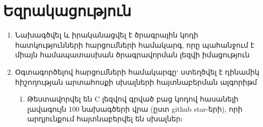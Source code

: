 {
	\section*{Եզրակացություն}\label{sec:conclusion}
	\begin{enumerate}
		\item
		Նախագծվել և իրականացվել է ծրագրային կոդի հատկությունների հարցումների համակարգ, որը պահանջում է միայն համապատասխան ծրագրավորման լեզվի իմացություն

		\item
		Օգտագործելով հարցումների համակարգը` ստեղծվել է դինամիկ հիշողության արտահոսքի սխալների հայտնաբերման ալգորիթմ
        {
			\begin{enumerate}[label=-]
				\item
				Թեստավորվել են C լեզվով գրված բաց կոդով հասանելի լավագույն 100 նախագծերի վրա (ըստ github star-երի),
				որի արդյունքում հայտնաբերվել են սխալներ։
			\end{enumerate}
		}

	\end{enumerate}
}